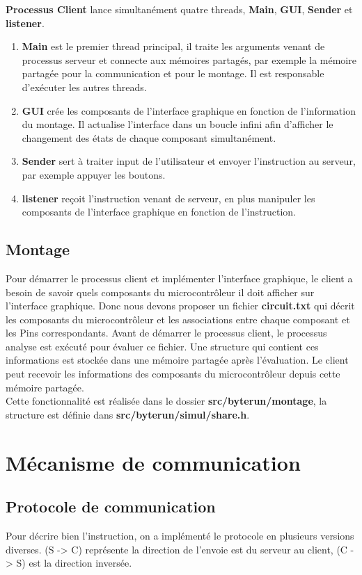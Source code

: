 \documentclass[14px]{article}
\begin{document}
\textbf{Processus Client} lance simultanément quatre threads, \textbf{Main}, \textbf{GUI}, \textbf{Sender} et \textbf{listener}.
\begin{enumerate}
	\item \textbf{Main} est le premier thread principal, il traite les arguments venant de processus serveur et connecte aux mémoires partagés, par exemple la mémoire partagée pour la communication et pour le montage. Il est responsable d'exécuter les autres threads.
	\item \textbf{GUI} crée les composants de l'interface graphique en fonction de l'information du montage. Il actualise l'interface dans un boucle infini afin d'afficher le changement des états de chaque composant simultanément.
	\item \textbf{Sender} sert à traiter input de l'utilisateur et envoyer l'instruction au serveur, par exemple appuyer les boutons.
	\item \textbf{listener} reçoit l'instruction venant de serveur, en plus manipuler les composants de l'interface graphique en fonction de l'instruction.
\end{enumerate}


\subsection{Montage}
Pour démarrer le processus client et implémenter l'interface graphique, le client a besoin de savoir quels composants du microcontrôleur il doit afficher sur l'interface graphique. Donc
nous devons proposer un fichier \textbf{circuit.txt} qui décrit les composants du microcontrôleur et les associations entre chaque composant et les Pins correspondants. Avant de démarrer le processus client, le processus analyse est exécuté pour évaluer ce fichier. Une structure qui contient ces informations est stockée dans une mémoire partagée après l'évaluation. Le client peut recevoir les informations des composants du microcontrôleur depuis cette mémoire partagée.\\
Cette fonctionnalité est réalisée dans le dossier \textbf{src/byterun/montage}, la structure est définie dans \textbf{src/byterun/simul/share.h}.


\section{Mécanisme de communication}
\subsection{Protocole de communication}
Pour décrire bien l'instruction, on a implémenté le protocole en plusieurs versions diverses. (S -> C) représente la direction de l'envoie est du serveur au client, (C -> S) est la direction inversée.
\end{document}
